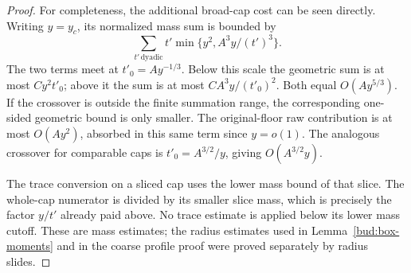 \begin{proof}
For completeness, the additional broad-cap cost can be seen directly.
Writing \(y=y_c\), its normalized mass sum is bounded by
\[
 \sum_{t'\,\text{dyadic}}t'\min\{y^2,A^3y/(t')^3\}.
\]
The two terms meet at \(t'_0=A y^{-1/3}\).  Below this scale the
geometric sum is at most \(Cy^2t'_0\); above it the sum is at most
\(CA^3y/(t'_0)^2\).  Both equal \(O(Ay^{5/3})\).
If the crossover is outside the finite summation range, the corresponding
one-sided geometric bound is only smaller.  The original-floor raw
contribution is at most \(O(Ay^2)\), absorbed in this same term since
\(y=o(1)\).  The analogous crossover for comparable caps is
\(t'_0=A^{3/2}/y\), giving \(O(A^{3/2}y)\).

The trace conversion on a sliced cap uses the lower mass bound of that
slice.  The whole-cap numerator is divided by its smaller slice mass,
which is precisely the factor \(y/t'\) already paid above.  No trace
estimate is applied below its lower mass cutoff.  These are mass
estimates; the radius estimates used in Lemma~\ref{bud:box-moments}
and in the coarse profile proof were proved separately by radius slides.
\end{proof}



